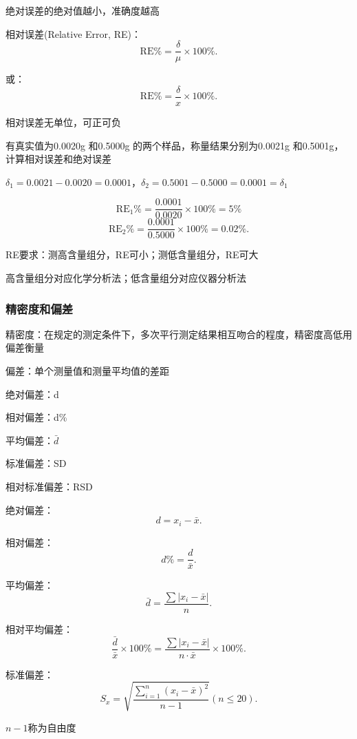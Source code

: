 绝对误差的绝对值越小，准确度越高

相对误差(Relative Error, RE)：\[
    \text{RE}\% = \frac{\delta}{\mu}\times 100\%
.\] 

或：\[
    \text{RE}\% = \frac{\delta}{x}\times 100\%
.\]

相对误差无单位，可正可负
\begin{eg}
    有真实值为0.0020g 和0.5000g 的两个样品，称量结果分别为0.0021g 和0.5001g，计算相对误差和绝对误差

$\delta_1=0.0021-0.0020=0.0001$，$\delta_2=0.5001-0.5000=0.0001=\delta_1$

\[
    \text{RE}_1\%=\frac{0.0001}{0.0020}\times 100\%=5\%
\]
\[
    \text{RE}_2\%=\frac{0.0001}{0.5000}\times 100\%=0.02\%
.\]  
\end{eg}
\begin{notation}
    RE要求：测高含量组分，RE可小；测低含量组分，RE可大

    高含量组分对应化学分析法；低含量组分对应仪器分析法
\end{notation}
\subsubsection{精密度和偏差}%
\label{subsub:精密度和偏差}
\begin{defi}
    精密度：在规定的测定条件下，多次平行测定结果相互吻合的程度，精密度高低用偏差衡量

    偏差：单个测量值和测量平均值的差距
\end{defi}
\begin{defi}
    绝对偏差：d

    相对偏差：d\%

    平均偏差：$\bar{d}$

    标准偏差：SD

    相对标准偏差：RSD
\end{defi}

绝对偏差：\[
    d=x_i-\bar{x}
.\]

相对偏差：\[
    d\%=\frac{d}{\bar{x}}
.\]

平均偏差：\[
    \bar{d}=\frac{\sum |x_{i}-\bar{x}|}{n}
.\]

相对平均偏差：\[
    \frac{\bar{d}}{\bar{x}}\times 100\%=\frac{\sum |x_{i}-\bar{x}|}{n\cdot \bar{x}}\times 100\%
.\]

标准偏差：\[
    S_x=\sqrt{\frac{{\sum_{i=1}^{n} \left( x_{i}-\bar{x} \right) ^2}}{n-1}} \left(n\le 20  \right) 
.\] 

$n-1 $称为自由度

